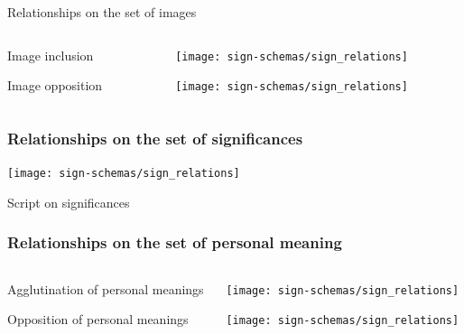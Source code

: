 \documentclass[default]{beamer}
\begin{document}
		\begin{frame}{Relationships on the set of images}
		
		\begin{columns}
		\begin{column}{0.3\textwidth}
			\centering
			Image inclusion
			\par\bigskip
			\par\bigskip
			\par\bigskip
			\par\bigskip
			\par\bigskip
			Image opposition
			
		\end{column}
		\begin{column}{0.7\textwidth}
			\texttt{[image: sign-schemas/sign\_relations]}
			
			\texttt{[image: sign-schemas/sign\_relations]}
		\end{column}
		\end{columns}
		
		\end{frame}	
		
		\begin{frame}
		\frametitle{Relationships on the set of significances}
		\centering
		\texttt{[image: sign-schemas/sign\_relations]}
		
		Script on significances
		\end{frame}	
		
		\begin{frame}
		\frametitle{Relationships on the set of personal meaning}
		
		\begin{columns}
		\begin{column}{0.3\textwidth}
		\centering
		Agglutination of personal meanings
		\par\bigskip
		\par\bigskip
		\par\bigskip
		\par\bigskip
		\par\bigskip
		Opposition of personal meanings
		
		\end{column}
		\begin{column}{0.7\textwidth}
		\texttt{[image: sign-schemas/sign\_relations]}
		\par\bigskip
		\texttt{[image: sign-schemas/sign\_relations]}
		\end{column}
		\end{columns}
		\end{frame}	
\end{document}
